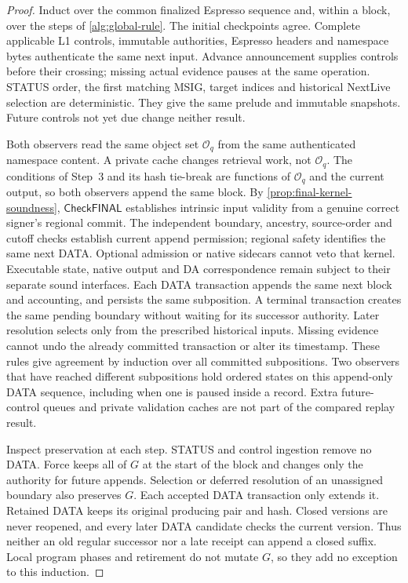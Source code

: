 \documentclass[11pt,a4paper]{article}
\newcommand{\tagg}[1]{\ensuremath{\mathsf{#1}}}
\begin{document}
\begin{proof}
Induct over the common finalized Espresso sequence and, within a block,
over the steps of \cref{alg:global-rule}.
The initial checkpoints agree. Complete applicable L1 controls,
immutable authorities, Espresso headers and namespace bytes authenticate
the same next input. Advance announcement supplies controls before their
crossing; missing actual evidence pauses at the same operation. STATUS order, the first matching MSIG, target indices and historical
NextLive selection are deterministic. They give the same prelude and
immutable snapshots. Future controls not yet due change neither result.

Both observers read the same object set $\mathcal O_q$ from the same
authenticated namespace content. A private cache changes retrieval work,
not $\mathcal O_q$. The conditions of Step~3 and its hash tie-break are
functions of $\mathcal O_q$ and the current output, so both observers
append the same block. By \cref{prop:final-kernel-soundness},
\tagg{CheckFINAL} establishes intrinsic input validity from a genuine
correct signer's regional commit. The independent boundary, ancestry,
source-order and cutoff checks establish current append permission;
regional safety identifies the same next DATA. Optional admission or
native sidecars cannot veto that kernel. Executable state, native output
and DA correspondence remain subject to their separate sound interfaces. Each DATA transaction appends the
same next block and accounting, and persists the same subposition.
A terminal transaction creates the same pending boundary without waiting
for its successor authority. Later resolution selects only from the prescribed historical inputs. Missing evidence
cannot undo the already committed transaction or alter its timestamp.
These rules give agreement by induction over all committed subpositions.
Two observers that have reached different subpositions hold ordered
states on this append-only DATA sequence, including when one is paused
inside a record. Extra future-control queues and private validation
caches are not part of the compared replay result.

Inspect preservation at each step. STATUS and control ingestion remove no DATA. Force keeps all of $G$ at the start of the block and changes only
the authority for future appends. Selection or deferred resolution of an unassigned boundary
also preserves $G$. Each accepted DATA transaction only extends it. Retained DATA keeps its
original producing pair and hash. Closed versions are never reopened,
and every later DATA candidate checks the current version. Thus
neither an old regular successor nor a late receipt can append a closed
suffix. Local program phases and retirement do not mutate $G$, so they
add no exception to this induction.
\end{proof}
\end{document}
